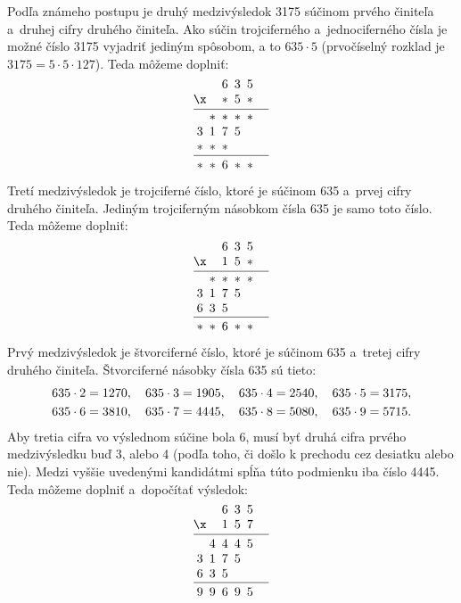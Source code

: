 {%
Podľa známeho postupu je druhý medzivýsledok 3175 súčinom prvého činiteľa a~druhej cifry druhého činiteľa.
Ako súčin trojciferného a~jednociferného čísla je možné číslo 3175 vyjadriť jediným spôsobom, a to $635\cdot5$ (prvočíselný rozklad je $3175=5\cdot5\cdot127$).
Teda môžeme doplniť:
$$
\vbox{\let\\=\cr
\halign{&\hbox to1.0em{\hss$#$\hss}\\
    &&6&3&5 \\
\x &&*&5&* \\
\noalign{\vskip4pt\hrule\vskip4pt}
   &*&*&*&* \\
   3&1&7&5&& \\
   *&*&*&&& \\
\noalign{\vskip4pt\hrule\vskip4pt}
  *&*&6&*&* \\
}}
$$

Tretí medzivýsledok je trojciferné číslo, ktoré je súčinom 635 a~prvej cifry druhého činiteľa.
Jediným trojciferným násobkom čísla 635 je samo toto číslo.
Teda môžeme doplniť:
$$
\vbox{\let\\=\cr
\halign{&\hbox to1.0em{\hss$#$\hss}\\
    &&6&3&5 \\
\x &&1&5&* \\
\noalign{\vskip4pt\hrule\vskip4pt}
   &*&*&*&* \\
   3&1&7&5&& \\
   6&3&5&&& \\
\noalign{\vskip4pt\hrule\vskip4pt}
  *&*&6&*&* \\
}}
$$

Prvý medzivýsledok je štvorciferné číslo, ktoré je súčinom 635 a~tretej cifry druhého činiteľa.
Štvorciferné násobky čísla 635 sú tieto:
$$
\gathered
635\cdot2=1270,\quad
635\cdot3=1905,\quad
635\cdot4=2540,\quad
635\cdot5=3175,\\
635\cdot6=3810,\quad
635\cdot7=4445,\quad
635\cdot8=5080,\quad
635\cdot9=5715.
\endgathered
$$
Aby tretia cifra vo výslednom súčine bola 6, musí byť druhá cifra prvého medzivýsledku buď 3, alebo 4 (podľa toho, či došlo k prechodu cez desiatku alebo nie).
Medzi vyššie uvedenými kandidátmi spĺňa túto podmienku iba číslo 4445.
Teda môžeme doplniť a~dopočítať výsledok:
$$
\vbox{\let\\=\cr
\halign{&\hbox to1.0em{\hss$#$\hss}\\
    &&6&3&5 \\
\x &&1&5&7 \\
\noalign{\vskip4pt\hrule\vskip4pt}
   &4&4&4&5 \\
   3&1&7&5&& \\
   6&3&5&&& \\
\noalign{\vskip4pt\hrule\vskip4pt}
  9&9&6&9&5 \\
}}
$$
}


